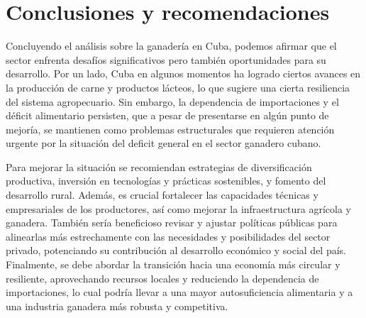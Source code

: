 \documentclass{article}
\begin{document}
\section{Conclusiones y recomendaciones}
Concluyendo el análisis sobre la ganadería en Cuba, podemos afirmar que el sector enfrenta desafíos significativos pero también oportunidades para su desarrollo. Por un lado, Cuba en algunos momentos ha logrado ciertos avances en la producción de carne y productos lácteos, lo que sugiere una cierta 
resiliencia del sistema agropecuario. Sin embargo, la dependencia de importaciones y el déficit alimentario persisten, que a pesar de presentarse en algún punto de mejoría, se mantienen como problemas estructurales que requieren atención urgente por la situación del deficit general en el sector ganadero cubano.

Para mejorar la situación se recomiendan estrategias de diversificación productiva, inversión en tecnologías y prácticas sostenibles, y fomento del desarrollo rural. Además, es crucial fortalecer las capacidades técnicas y empresariales de los productores, 
así como mejorar la infraestructura agrícola y ganadera. También sería beneficioso revisar y ajustar políticas públicas para alinearlas más estrechamente con las necesidades y posibilidades del sector privado, potenciando su contribución al desarrollo económico y social del país. 
Finalmente, se debe abordar la transición hacia una economía más circular y resiliente, aprovechando recursos locales y reduciendo la dependencia de importaciones, lo cual podría llevar a una mayor autosuficiencia alimentaria y a una industria ganadera más robusta y competitiva.
\end{document}
